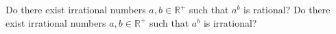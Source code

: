 Do there exist irrational numbers $a, b \in \mathbb{R}^{+}$ such that $a^b$ is rational?\newline
Do there exist irrational numbers $a, b \in \mathbb{R}^{+}$ such that $a^b$ is irrational?
